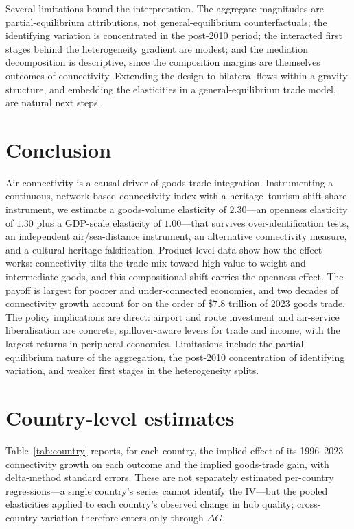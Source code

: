 Several limitations bound the interpretation. The aggregate magnitudes are
partial-equilibrium attributions, not general-equilibrium counterfactuals; the
identifying variation is concentrated in the post-2010 period; the interacted
first stages behind the heterogeneity gradient are modest; and the mediation
decomposition is descriptive, since the composition margins are themselves
outcomes of connectivity. Extending the design to bilateral flows within a
gravity structure, and embedding the elasticities in a general-equilibrium
trade model, are natural next steps.

\section{Conclusion}
Air connectivity is a causal driver of goods-trade integration. Instrumenting a
continuous, network-based connectivity index with a heritage--tourism
shift-share instrument, we estimate a goods-volume elasticity of $2.30$---an
openness elasticity of $1.30$ plus a GDP-scale elasticity of $1.00$---that
survives over-identification tests, an independent air/sea-distance instrument,
an alternative connectivity measure, and a cultural-heritage falsification.
Product-level data show how the effect works: connectivity tilts the trade mix
toward high value-to-weight and intermediate goods, and this compositional
shift carries the openness effect. The payoff is largest for poorer and
under-connected economies, and two decades of connectivity growth account for
on the order of \$7.8 trillion of 2023 goods trade. The policy implications are
direct: airport and route investment and air-service liberalisation are
concrete, spillover-aware levers for trade and income, with the largest returns
in peripheral economies. Limitations include the partial-equilibrium nature of
the aggregation, the post-2010 concentration of identifying variation, and
weaker first stages in the heterogeneity splits.

\appendix
\section{Country-level estimates}
\label{app:country}
Table~\ref{tab:country} reports, for each country, the implied effect of its
1996--2023 connectivity growth on each outcome and the implied goods-trade gain,
with delta-method standard errors. These are not separately estimated
per-country regressions---a single country's series cannot identify the IV---but
the pooled elasticities applied to each country's observed change in hub
quality; cross-country variation therefore enters only through $\Delta G$.

